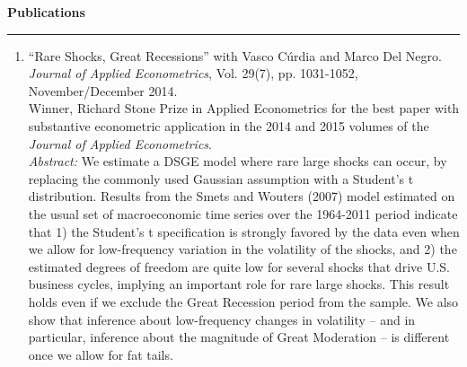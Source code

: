 \documentclass[a4paper, 10pt]{article}
\newcounter{mycounter}
\newcommand{\cvsec}[1]
{
	\needspace{2\baselineskip}
	\noindent \textbf{#1}
	
	\vspace{2pt}
	
	\hrule
	
	\bigskip
}
\newenvironment{cvcontinue}[1]
{
	\cvsec{#1}
	\begin{enumerate}
		\setcounter{enumi}{\themycounter}
	}
	{
	\setcounter{mycounter}{\theenumi}
	\end{enumerate}
}
\begin{document}
\begin{cvcontinue}{Publications}
	\item ``Rare Shocks, Great Recessions'' with Vasco C\'{u}rdia and Marco Del Negro. \emph{Journal of Applied Econometrics}, Vol. 29(7), pp. 1031-1052, November/December 2014. \\
	
	\noindent Winner, Richard Stone Prize in Applied Econometrics for the best paper with substantive econometric application in the 2014 and 2015 volumes of the \emph{Journal of Applied Econometrics}. \\
	
	\emph{Abstract:}  We estimate a DSGE model where rare large shocks can occur, by replacing the commonly used Gaussian assumption with a Student's t distribution. Results from the Smets and Wouters (2007) model estimated on the usual set of macroeconomic time series over the 1964-2011 period indicate that 1) the Student's t specification is strongly favored by the data even when we allow for low-frequency variation in the volatility of the shocks, and 2) the estimated degrees of freedom are quite low for several shocks that drive U.S. business cycles, implying an important role for rare large shocks. This result holds even if we exclude the Great Recession period from the sample. We also show that inference about low-frequency changes in volatility -- and in particular, inference about the magnitude of Great Moderation -- is different once we allow for fat tails.
\end{cvcontinue}
\end{document}
